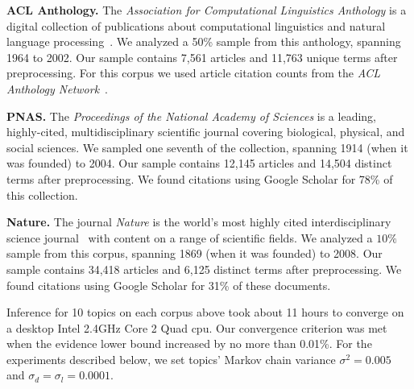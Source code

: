 \textbf{ACL Anthology.} The \emph{Association for Computational
  Linguistics Anthology} is a digital collection of publications about
computational linguistics and natural language
processing~\citep{bird:2008}.  We analyzed a 50\% sample from this
anthology, spanning 1964 to 2002.  Our sample contains 7,561
articles and 11,763 unique terms after preprocessing.  For this corpus
we used article citation counts from the \emph{ACL Anthology
  Network}~\citep{Radev:2009}.

\textbf{PNAS.} The \emph{Proceedings of the National Academy of
  Sciences} is a leading, highly-cited, multidisciplinary scientific
journal covering biological, physical, and social sciences.  We
sampled one seventh of the collection, spanning 1914 (when it was
founded) to 2004.  Our sample contains 12,145 articles and 14,504
distinct terms after preprocessing.  We found citations using Google
Scholar for 78\% of this collection.

\textbf{Nature.} The journal \emph{Nature} is the world's most highly
cited interdisciplinary science journal~\citep{Thompson:2009} with
content on a range of scientific fields. We analyzed a $10\%$
sample from this corpus, spanning 1869 (when it was founded) to
2008.  Our sample contains 34,418 articles and 6,125 distinct terms
after preprocessing.  We found citations using Google Scholar for 31\%
of these documents.

Inference for 10 topics on each corpus above took about 11 hours to
converge on a desktop Intel 2.4GHz Core 2 Quad cpu.  Our convergence
criterion was met when the evidence lower bound increased by no more
than 0.01\%.  For the experiments described below, we set topics'
Markov chain variance $\sigma^2=0.005$ and $\sigma_d=\sigma_l=0.0001$.



